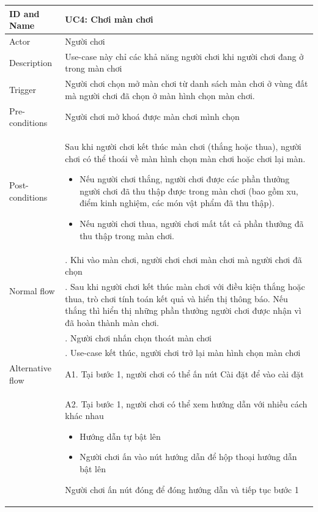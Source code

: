 \begin{center}
	\begin{tabular}{|l|p{12cm}|}
		\hline
		ID and Name & UC4: Chơi màn chơi \\
		\hline
		Actor  & Người chơi \\
		\hline
		Description  & Use-case này chỉ các khả năng người chơi khi người chơi đang ở trong màn chơi\\
		\hline
		Trigger  & Người chơi chọn mở màn chơi từ danh sách màn chơi ở vùng đất mà người chơi đã chọn ở màn hình chọn màn chơi.\\
		\hline
		Pre-conditions & Người chơi mở khoá được màn chơi mình chọn\\
		\hline
		Post-conditions & Sau khi người chơi kết thúc màn chơi (thắng hoặc thua), người chơi có thể thoái về màn hình chọn màn chơi hoặc chơi lại màn. 
		\begin{itemize}
			\item Nếu người chơi thắng, người chơi được các phần thưởng người chơi đã thu thập được trong màn chơi (bao gồm xu, điểm kinh nghiệm, các món vật phẩm đã thu thập).
			\item Nếu người chơi thua, người chơi mất tất cả phần thưởng đã thu thập trong màn chơi.
		\end{itemize}\\
		\hline
		\multirow{2}{*}{Normal flow}      &\qquad 1. Khi vào màn chơi, người chơi chơi màn chơi mà người chơi đã chọn\\
		&\qquad 2. Sau khi người chơi kết thúc màn chơi với điều kiện thắng hoặc thua, trò chơi tính toán kết quả và hiển thị thông báo. Nếu thắng thì hiển thị những phần thưởng người chơi được nhận vì đã hoàn thành màn chơi.\\
		&\qquad 3. Người chơi nhấn chọn thoát màn chơi\\
		&\qquad 4. Use-case kết thúc, người chơi trở lại màn hình chọn màn chơi\\
		\hline
		Alternative flow  & \qquad A1. Tại bước 1, người chơi có thể ấn nút Cài đặt để vào cài đặt\\
		&\qquad A2. Tại bước 1,  người chơi có thể xem hướng dẫn với nhiều cách khác nhau \begin{itemize}
			\item Hướng dẫn tự bật lên
			\item Người chơi ấn vào nút hướng dẫn để hộp thoại hướng dẫn bật lên
		\end{itemize} Người chơi ấn nút đóng để đóng hướng dẫn và tiếp tục bước 1\\

\end{tabular}
\end{center}
